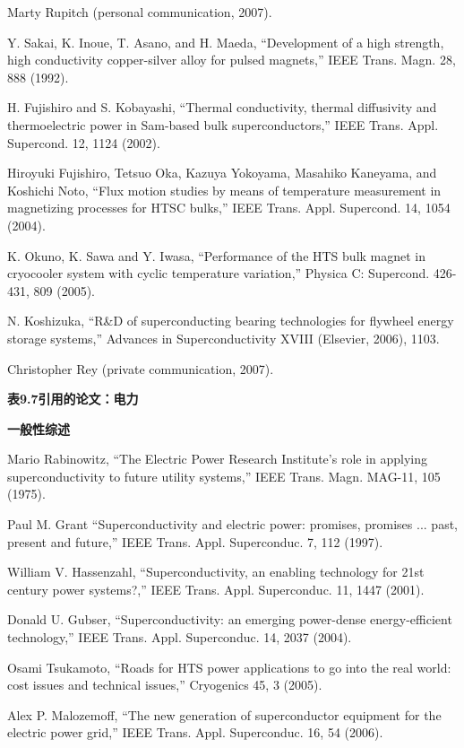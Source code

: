 \noindent [9.17] Marty Rupitch (personal communication, 2007).

\noindent [9.18] Y. Sakai, K. Inoue, T. Asano, and H. Maeda, ``Development of a high strength, high conductivity copper-silver alloy for pulsed magnets,” IEEE Trans. Magn. 28, 888 (1992).

\noindent [9.19] H. Fujishiro and S. Kobayashi, ``Thermal conductivity, thermal diffusivity and thermoelectric power in Sam-based bulk superconductors,” IEEE Trans. Appl. Supercond. 12, 1124 (2002).

\noindent [9.20] Hiroyuki Fujishiro, Tetsuo Oka, Kazuya Yokoyama, Masahiko Kaneyama, and Koshichi Noto, ``Flux motion studies by means of temperature measurement in magnetizing processes for HTSC bulks,” IEEE Trans. Appl. Supercond. 14, 1054 (2004).

\noindent [9.21] K. Okuno, K. Sawa and Y. Iwasa, ``Performance of the HTS bulk magnet in cryocooler system with cyclic temperature variation,” Physica C: Supercond. 426-431, 809 (2005).

\noindent [9.22] N. Koshizuka, ``R\&D of superconducting bearing technologies for flywheel energy storage systems,” Advances in Superconductivity XVIII (Elsevier, 2006), 1103.

\noindent [9.23] Christopher Rey (private communication, 2007).

\noindent \textbf{表9.7引用的论文：电力}

\noindent \textbf{一般性综述}

\noindent [9.24] Mario Rabinowitz, ``The Electric Power Research Institute’s role in applying superconductivity
to future utility systems,” IEEE Trans. Magn. MAG-11, 105 (1975).

\noindent [9.25] Paul M. Grant ``Superconductivity and electric power: promises, promises ... past,
present and future,” IEEE Trans. Appl. Superconduc. 7, 112 (1997).

\noindent [9.26] William V. Hassenzahl, ``Superconductivity, an enabling technology for 21st century
power systems?,” IEEE Trans. Appl. Superconduc. 11, 1447 (2001).

\noindent [9.27] Donald U. Gubser, ``Superconductivity: an emerging power-dense energy-efficient
technology,” IEEE Trans. Appl. Superconduc. 14, 2037 (2004).

\noindent [9.28] Osami Tsukamoto, ``Roads for HTS power applications to go into the real world:
cost issues and technical issues,” Cryogenics 45, 3 (2005).

\noindent [9.29] Alex P. Malozemoff, ``The new generation of superconductor equipment for the
electric power grid,” IEEE Trans. Appl. Superconduc. 16, 54 (2006).

